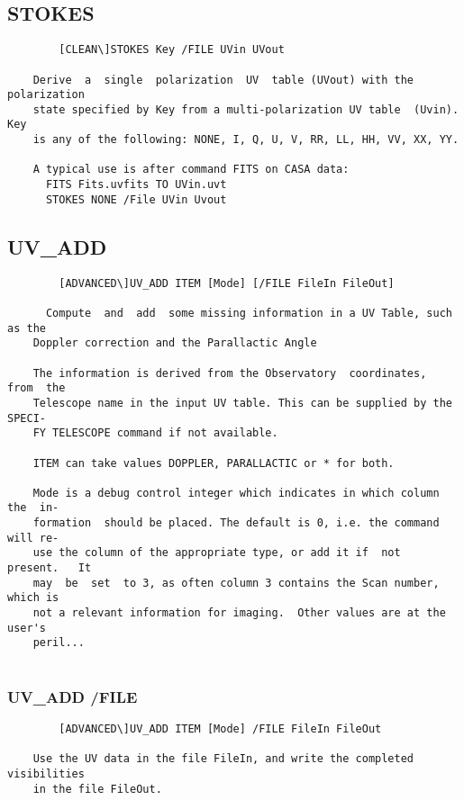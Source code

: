 \subsection{STOKES}
\begin{verbatim}
        [CLEAN\]STOKES Key /FILE UVin UVout

    Derive  a  single  polarization  UV  table (UVout) with the polarization
    state specified by Key from a multi-polarization UV table  (Uvin).   Key
    is any of the following: NONE, I, Q, U, V, RR, LL, HH, VV, XX, YY.

    A typical use is after command FITS on CASA data:
      FITS Fits.uvfits TO UVin.uvt
      STOKES NONE /File UVin Uvout

\end{verbatim}
\subsection{UV\_ADD}
\begin{verbatim}
        [ADVANCED\]UV_ADD ITEM [Mode] [/FILE FileIn FileOut]

      Compute  and  add  some missing information in a UV Table, such as the
    Doppler correction and the Parallactic Angle

    The information is derived from the Observatory  coordinates,  from  the
    Telescope name in the input UV table. This can be supplied by the SPECI-
    FY TELESCOPE command if not available.

    ITEM can take values DOPPLER, PARALLACTIC or * for both.

    Mode is a debug control integer which indicates in which column the  in-
    formation  should be placed. The default is 0, i.e. the command will re-
    use the column of the appropriate type, or add it if  not  present.   It
    may  be  set  to 3, as often column 3 contains the Scan number, which is
    not a relevant information for imaging.  Other values are at the  user's
    peril...


\end{verbatim}
\subsubsection{UV\_ADD /FILE}
\begin{verbatim}
        [ADVANCED\]UV_ADD ITEM [Mode] /FILE FileIn FileOut

    Use the UV data in the file FileIn, and write the completed visibilities
    in the file FileOut.

\end{verbatim}
